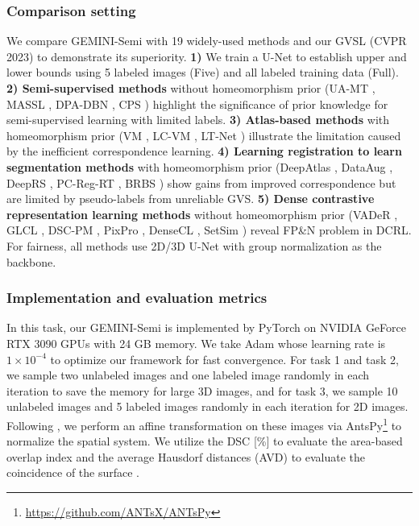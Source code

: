 \subsubsection{Comparison setting} \label{sec:comparison2}
We compare GEMINI-Semi with 19 widely-used methods and our GVSL \cite{He_2023_CVPR} (CVPR 2023) to demonstrate its superiority. \textbf{1)} We train a U-Net \cite{ronneberger2015u} to establish upper and lower bounds using 5 labeled images (Five) and all labeled training data (Full). \textbf{2) Semi-supervised methods} without homeomorphism prior (UA-MT \cite{yu2019uncertainty}, MASSL \cite{chen2019multi}, DPA-DBN \cite{he2020dense}, CPS \cite{chen2021semi}) highlight the significance of prior knowledge for semi-supervised learning with limited labels. \textbf{3) Atlas-based methods} with homeomorphism prior (VM \cite{ba2018un}, LC-VM \cite{BalakrishnanVoxelMorph(u)}, LT-Net \cite{wang2020lt}) illustrate the limitation caused by the inefficient correspondence learning. \textbf{4) Learning registration to learn segmentation methods} with homeomorphism prior (DeepAtlas \cite{xu2019deepatlas}, DataAug \cite{zhao2019data}, DeepRS \cite{he2020deep}, PC-Reg-RT \cite{he2021few}, BRBS \cite{he2022learning}) show gains from improved correspondence but are limited by pseudo-labels from unreliable GVS. \textbf{5) Dense contrastive representation learning methods} without homeomorphism prior (VADeR \cite{o2020unsupervised}, GLCL \cite{chaitanya2020contrastive}, DSC-PM \cite{li2021dense}, PixPro \cite{xie2021propagate}, DenseCL \cite{wang2022densecl}, SetSim \cite{wang2022exploring}) reveal FP\&N problem in DCRL. For fairness, all methods use 2D/3D U-Net \cite{ronneberger2015u} with group normalization \cite{wu2018group} as the backbone.

\subsubsection{Implementation and evaluation metrics} In this task, our GEMINI-Semi is implemented by PyTorch \cite{paszke2019pytorch} on NVIDIA GeForce RTX 3090 GPUs with 24 GB memory. We take Adam whose learning rate is $1\times10^{-4}$ to optimize our framework for fast convergence. For task 1 and task 2, we sample two unlabeled images and one labeled image randomly in each iteration to save the memory for large 3D images, and for task 3, we sample 10 unlabeled images and 5 labeled images randomly in each iteration for 2D images. Following \cite{he2022learning}, we perform an affine transformation on these images via AntsPy\footnote{\url{https://github.com/ANTsX/ANTsPy}} to normalize the spatial system. We utilize the DSC [\%] to evaluate the area-based overlap index and the average Hausdorf distances (AVD) to evaluate the coincidence of the surface \cite{taha2015metrics}.

